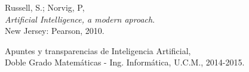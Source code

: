 \documentclass[11pt, a4paper, spanish, openright, twoside]{book}
\begin{document}
\begin{thebibliography}{9}

	Russell, S.; Norvig, P, \\
	\emph{Artificial Intelligence, a modern aproach}.\\
	New Jersey: Pearson, 2010.
	
	Apuntes y transparencias de Inteligencia Artificial, \\
	Doble Grado Matemáticas - Ing. Informática, U.C.M., 2014-2015.

\end{thebibliography}
\end{document}
